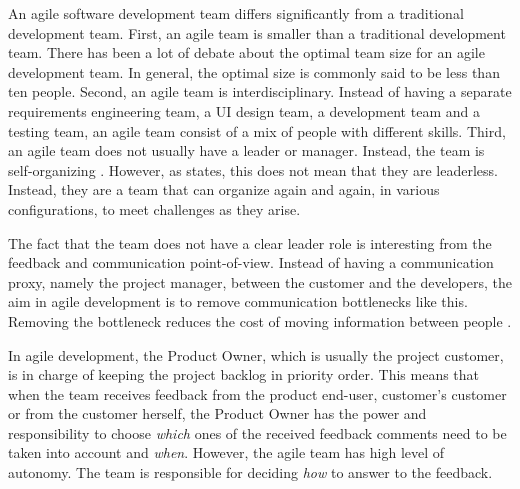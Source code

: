 \documentclass[english,12pt,a4paper,pdftex]{article}
\begin{document}
An agile software development team differs significantly from a traditional development team. First, an agile team is smaller than a traditional development team. There has been a lot of debate about the optimal team size for an agile development team. In general, the optimal size is commonly said to be less than ten people. Second, an agile team is interdisciplinary. Instead of having a separate requirements engineering team, a \ac{UI} design team, a development team and a testing team, an agile team consist of a mix of people with different skills. Third, an agile team does not usually have a leader or manager. Instead, the team is self-organizing \citep{cockburn2001}. However, as \citet{cockburn2001} states, this does not mean that they are leaderless. Instead, they are a team that can organize again and again, in various configurations, to meet challenges as they arise.

The fact that the team does not have a clear leader role is interesting from the feedback and communication point-of-view. Instead of having a communication proxy, namely the project manager, between the customer and the developers, the aim in agile development is to remove communication bottlenecks like this. Removing the bottleneck reduces the cost of moving information between people \citep{cockburn2001}.

In agile development, the Product Owner, which is usually the project customer, is in charge of keeping the project backlog in priority order. This means that when the team receives feedback from the product end-user, customer's customer or from the customer herself, the Product Owner has the power and responsibility to choose \emph{which} ones of the received feedback comments need to be taken into account and \emph{when}. However, the agile team has high level of autonomy. The team is responsible for deciding \emph{how} to answer to the feedback. 

\end{document}
